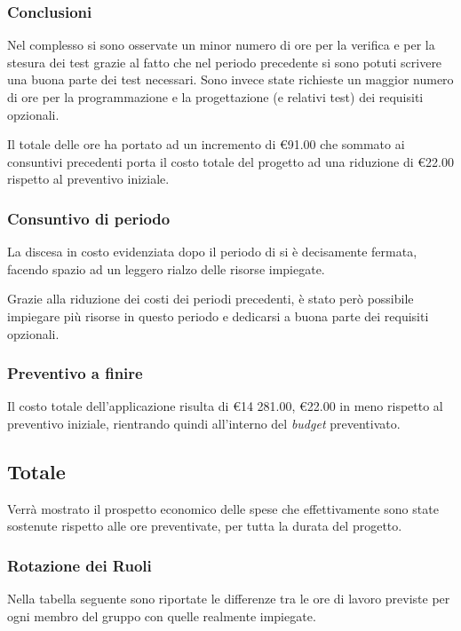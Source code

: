 \documentclass[12pt,a4paper]{article}
\begin{document}
\subsubsection{Conclusioni}

Nel complesso si sono osservate un minor numero di ore per la verifica e per la stesura dei test grazie al fatto che nel periodo precedente si sono potuti scrivere una buona parte dei test necessari. Sono invece state richieste un maggior numero di ore per la programmazione e la progettazione (e relativi test) dei requisiti opzionali.

Il totale delle ore ha portato ad un incremento di \euro{}91.00 che sommato ai consuntivi precedenti porta il costo totale del progetto ad una riduzione di \euro{}22.00 rispetto al preventivo iniziale.

\subsubsection{Consuntivo di periodo}

\par La discesa in costo evidenziata dopo il periodo di \FAD{} si è decisamente fermata, facendo spazio ad un leggero rialzo delle risorse impiegate. 

\par Grazie alla riduzione dei costi dei periodi precedenti, è stato però possibile impiegare più risorse in questo periodo e dedicarsi a buona parte dei requisiti opzionali.

\subsubsection{Preventivo a finire}

\par Il costo totale dell'applicazione risulta di \euro{}14 281.00, \euro22.00 in meno rispetto al preventivo iniziale, rientrando quindi all'interno del \textit{budget} preventivato.

\newpage

\subsection{Totale}

Verrà mostrato il prospetto economico delle spese che effettivamente sono state sostenute rispetto alle ore preventivate, per tutta la durata del progetto.

\subsubsection{Rotazione dei Ruoli}
Nella tabella seguente sono riportate le differenze tra le ore di lavoro previste per ogni membro del gruppo con quelle realmente impiegate.
\end{document}

